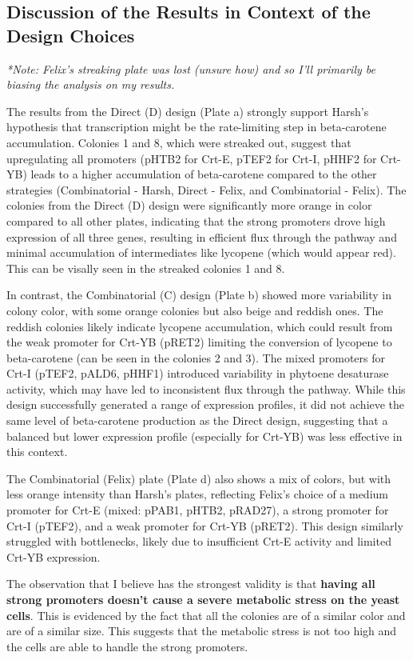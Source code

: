\documentclass[12pt,a4paper]{article}
\begin{document}
\subsection{Discussion of the Results in Context of the Design Choices}
\textit{*Note: Felix's streaking plate was lost (unsure how) and so I'll primarily be biasing the analysis on my results.}

The results from the Direct (D) design (Plate a) strongly support Harsh's
hypothesis that transcription might be the rate-limiting step in beta-carotene
accumulation. Colonies 1 and 8, which were streaked out, suggest that
upregulating all promoters (pHTB2 for Crt-E, pTEF2 for Crt-I, pHHF2 for Crt-YB)
leads to a higher accumulation of beta-carotene compared to the other
strategies (Combinatorial - Harsh, Direct - Felix, and Combinatorial - Felix).
The colonies from the Direct (D) design were significantly more orange in color
compared to all other plates, indicating that the strong promoters drove high
expression of all three genes, resulting in efficient flux through the pathway
and minimal accumulation of intermediates like lycopene (which would appear
red). This can be visally seen in the streaked colonies 1 and 8.

In contrast, the Combinatorial (C) design (Plate b) showed more variability in
colony color, with some orange colonies but also beige and reddish ones. The
reddish colonies likely indicate lycopene accumulation, which could result from
the weak promoter for Crt-YB (pRET2) limiting the conversion of lycopene to
beta-carotene (can be seen in the colonies 2 and 3). The mixed promoters for
Crt-I (pTEF2, pALD6, pHHF1) introduced variability in phytoene desaturase
activity, which may have led to inconsistent flux through the pathway. While
this design successfully generated a range of expression profiles, it did not
achieve the same level of beta-carotene production as the Direct design,
suggesting that a balanced but lower expression profile (especially for Crt-YB)
was less effective in this context.

The Combinatorial (Felix) plate (Plate d) also shows a mix of colors, but with
less orange intensity than Harsh’s plates, reflecting Felix’s choice of a
medium promoter for Crt-E (mixed: pPAB1, pHTB2, pRAD27), a strong promoter for
Crt-I (pTEF2), and a weak promoter for Crt-YB (pRET2). This design similarly
struggled with bottlenecks, likely due to insufficient Crt-E activity and
limited Crt-YB expression.

The observation that I believe has the strongest validity is that
\textbf{having all strong promoters doesn't cause a severe metabolic stress on
    the yeast cells}. This is evidenced by the fact that all the colonies are of a
similar color and are of a similar size. This suggests that the metabolic
stress is not too high and the cells are able to handle the strong promoters.
\end{document}
